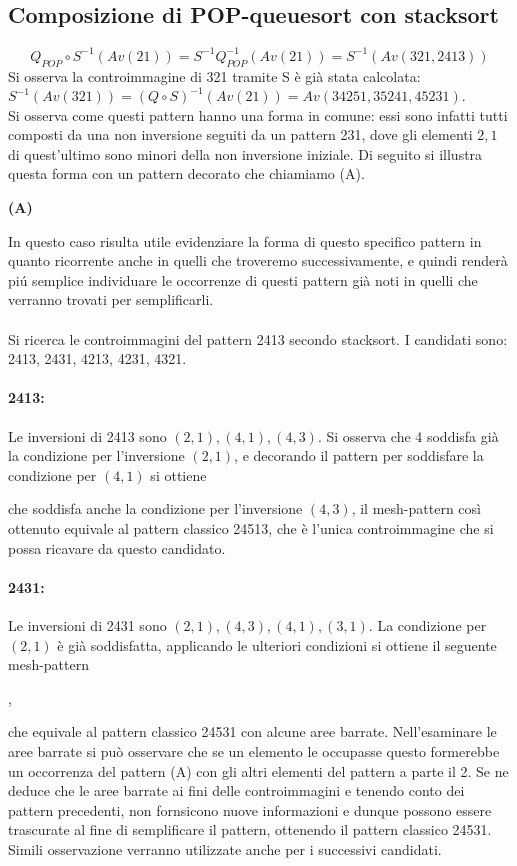 \subsection{Composizione di {POP-queuesort} con {stacksort}} 
$$Q_{POP}\circ S^{-1}(Av(21)) = S^{-1}Q_{POP}^{-1}(Av(21)) = S^{-1}(Av(321, 2413))$$
Si osserva la controimmagine di 321 tramite S \`e gi\`a stata calcolata: $S^{-1}(Av(321)) = (Q\circ S)^{-1}(Av(21)) = Av(34251, 35241, 45231)$.\\
Si osserva come questi pattern hanno una forma in comune: essi sono infatti tutti composti da una non inversione seguiti da un pattern 231, dove gli elementi $2,1$ di quest'ultimo sono minori della non inversione iniziale. Di seguito si illustra questa forma con un pattern decorato che chiamiamo (A).
\begin{center}
\textbf{(A)}
\end{center}
In questo caso risulta utile evidenziare la forma di questo specifico pattern in quanto ricorrente anche in quelli che troveremo successivamente, e quindi render\`a pi\'u semplice individuare le occorrenze di questi pattern gi\`a noti in quelli che verranno trovati per semplificarli.\\\\
Si ricerca le controimmagini del pattern 2413 secondo stacksort. I candidati sono: 2413, 2431, 4213, 4231, 4321.
\paragraph*{2413:} Le inversioni di 2413 sono $(2,1),(4,1),(4,3)$. Si osserva che 4 soddisfa gi\`a la condizione per l'inversione $(2,1)$, e decorando il pattern per soddisfare la condizione per $(4,1)$ si ottiene
\begin{center}\end{center} che soddisfa anche la condizione per l'inversione $(4,3)$, il mesh-pattern cos\`i ottenuto equivale al pattern classico 24513, che \`e l'unica controimmagine che si possa ricavare da questo candidato.
\paragraph*{2431:} Le inversioni di 2431 sono $(2,1),(4,3),(4,1),(3,1)$. La condizione per $(2,1)$ \`e gi\`a soddisfatta, applicando le ulteriori condizioni si ottiene il seguente mesh-pattern
\begin{center}
,
\end{center}
che equivale al pattern classico 24531 con alcune aree barrate. Nell'esaminare le aree barrate si pu\`o osservare che se un elemento le occupasse questo formerebbe un occorrenza del pattern (A) con gli altri elementi del pattern a parte il 2. Se ne deduce che le aree barrate ai fini
delle controimmagini e tenendo conto dei pattern precedenti, non fornsicono nuove informazioni e dunque possono essere trascurate al fine di semplificare il pattern, ottenendo il pattern classico 24531. Simili osservazione verranno utilizzate anche per i successivi candidati. 
